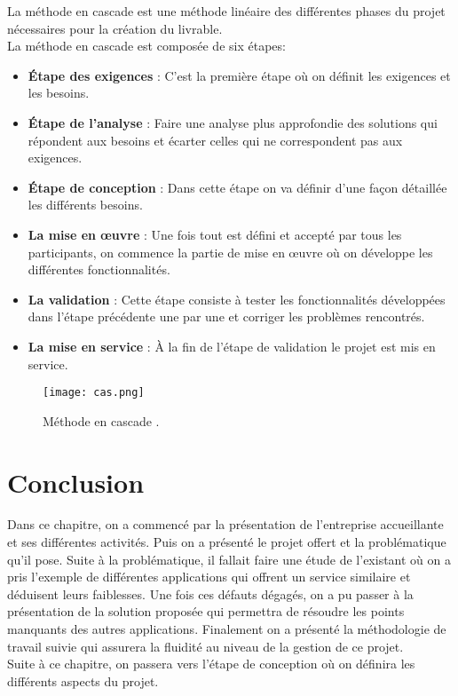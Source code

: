 La méthode en cascade est une méthode linéaire des différentes phases du projet nécessaires pour la création du livrable.\\
\noindent La méthode en cascade est composée de six étapes:
\begin{itemize}
    \item \textbf{Étape des exigences} : C'est la première étape où on définit les exigences et les besoins.
    \item \textbf{Étape de l'analyse} : Faire une analyse plus approfondie des solutions qui répondent aux besoins et écarter celles qui ne correspondent pas aux exigences.
    \item \textbf{Étape de conception} : Dans cette étape on va définir d'une façon détaillée les différents besoins.
    \item \textbf{La mise en œuvre} : Une fois tout est défini et accepté par tous les participants, on commence la partie de mise en œuvre où on développe les différentes fonctionnalités.
    \item \textbf{La validation} : Cette étape consiste à tester les fonctionnalités développées dans l'étape précédente une par une et corriger les problèmes rencontrés.
    \item \textbf{La mise en service} : À la fin de l'étape de validation le projet est mis en service.
\end{itemize}
\vspace{1cm}
\begin{figure}[H]
    \centering
    \texttt{[image: cas.png]}
    \captionsetup{justification=centering}
    \caption{Méthode en cascade .}\cite{cascade}
    \label{fig:cascade}
\end{figure}

\section*{Conclusion}
Dans ce chapitre, on a commencé par la présentation de l'entreprise accueillante et ses différentes activités. Puis on a présenté le projet offert et la problématique qu'il pose. Suite à la problématique, il fallait faire une étude de l'existant où on a pris l'exemple de différentes applications qui offrent un service similaire et déduisent leurs faiblesses. Une fois ces défauts dégagés, on a pu passer à la présentation de la solution proposée qui permettra de résoudre les points manquants des autres applications. Finalement on a présenté la méthodologie de travail suivie qui assurera la fluidité au niveau de la gestion de ce projet.\\
Suite à ce chapitre, on passera vers l'étape de conception où on définira les différents aspects du projet.